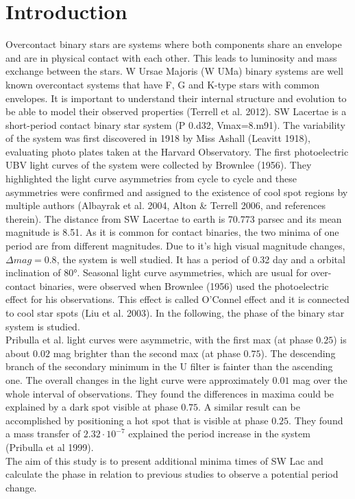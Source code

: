 \section{Introduction}
\label{sec:Theorie}

Overcontact binary stars are systems where both components share an envelope and 
are in physical contact with each other. This leads to luminosity and mass exchange 
between the stars. W Ursae Majoris (W UMa) binary systems are well known overcontact 
systems that have F, G and K-type stars with common envelopes. It is important to 
understand their internal structure and evolution to be able to model their observed 
properties (Terrell et al. 2012). SW Lacertae is a short-period contact binary star 
system (P 0.d32, Vmax=8.m91). The variability of the system was first discovered in 
1918 by Miss Ashall (Leavitt 1918), evaluating photo plates taken at the Harvard Observatory. 
The first photoelectric 
UBV light curves of the system were collected by Brownlee (1956). They highlighted the 
light curve asymmetries from cycle to cycle and these asymmetries were confirmed and 
assigned to the existence of cool spot regions by multiple authors (Albayrak et al. 
2004, Alton \& Terrell 2006, and references therein). The distance from SW Lacertae to 
earth is 70.773 parsec and its mean magnitude is 8.51. As it is common for contact 
binaries, the two minima of one period are from different magnitudes. Due to it’s 
high visual magnitude changes, $\Delta mag = 0.8$, the system is well studied. It has a 
period of 0.32 day and a orbital inclination of 80°. Seasonal light curve asymmetries,
 which are usual for over-contact binaries, were observed when Brownlee (1956) used the
  photoelectric effect for his observations. This effect is called O’Connel effect and 
  it is connected to cool star spots (Liu et al. 2003). 
In the following, the phase of the binary star system is studied.\\

\noindent Pribulla et al. light curves were asymmetric, with the first max (at phase $0.25$) is about 
$0.02$ mag brighter than the second max (at phase $0.75$). The descending branch of the 
secondary minimum in the U filter is fainter than the ascending one. The overall changes 
in the light curve were approximately $0.01$ mag over the whole interval of observations. 
They found the differences in maxima could be explained by a dark spot visible at phase $0.75$.
 A similar result can be accomplished by positioning a hot spot that is visible at phase $0.25$.
  They found a mass transfer of $2.32 \cdot 10^{-7}$ explained the period increase in the system 
  (Pribulla et al 1999).\\

\noindent The aim of this study is to present additional minima times of SW Lac and calculate the phase in 
relation to previous studies to observe a potential period change. 
